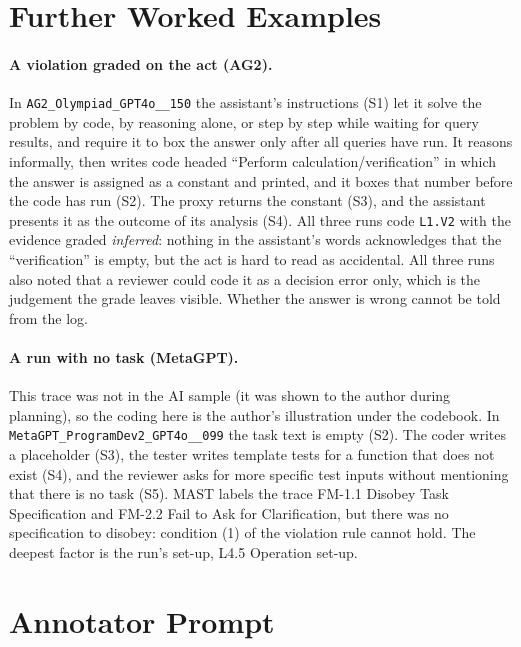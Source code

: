 \documentclass[10pt]{article}
\newcommand{\code}[1]{\texttt{#1}}
\begin{document}
\section{Further Worked Examples}
\label{app:cases}
\sloppy

\paragraph{A violation graded on the act (AG2).} In
\code{AG2\_Olympiad\_GPT4o\_\_150} the assistant's instructions (S1) let it solve
the problem by code, by reasoning alone, or step by step while waiting for query
results, and require it to box the answer only after all queries have run. It reasons informally, then writes code headed ``Perform
calculation/verification'' in which the answer is assigned as a constant and
printed, and it boxes that number before the code has run (S2). The proxy returns
the constant (S3), and the assistant presents it as the outcome of its analysis
(S4). All three runs code \code{L1.V2} with the evidence graded \emph{inferred}:
nothing in the assistant's words acknowledges that the ``verification'' is empty,
but the act is hard to read as accidental. All three runs also noted that a reviewer
could code it as a decision error only, which is the judgement the grade leaves
visible.
Whether the answer is wrong cannot be told from the log.

\paragraph{A run with no task (MetaGPT).} This trace was not in the AI sample (it
was shown to the author during planning), so the coding here is the author's
illustration under the codebook. In \code{MetaGPT\_ProgramDev2\_GPT4o\_\_099} the
task text is empty (S2). The coder
writes a placeholder (S3), the tester writes template tests for a function that
does not exist (S4), and the reviewer asks for more specific test inputs without
mentioning that there is no task (S5). MAST labels the trace FM-1.1 Disobey Task
Specification and FM-2.2 Fail to Ask for Clarification, but there was no
specification to disobey: condition (1) of the violation rule cannot hold. The
deepest factor is the run's set-up, L4.5 Operation set-up.


\section{Annotator Prompt}
\label{app:prompt}
\end{document}
